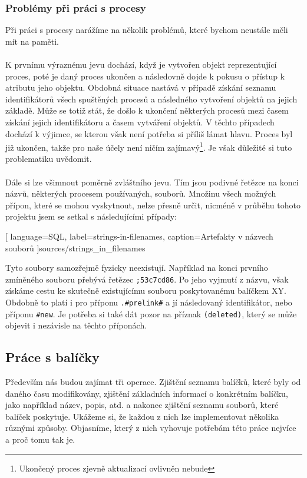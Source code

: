 \documentclass[
  field=inf,
  biblatex,
  glossaries,
  index
]{kidiplom}
\begin{document}
	\subsubsection{Problémy při práci s procesy}
		Při práci s procesy narážíme na několik problémů, které bychom neustále měli mít na paměti.
		\\
		\\
		K prvnímu výraznému jevu dochází, když je vytvořen objekt reprezentující proces, poté je daný proces ukončen a následovně dojde k pokusu o přístup k atributu jeho objektu. Obdobná situace nastává v případě získání seznamu identifikátorů všech spuštěných procesů a následného vytvoření objektů na jejich základě. Může se totiž stát, že došlo k ukončení některých procesů mezi časem získání jejich identifikátoru a časem vytváření objektů. V těchto případech dochází k výjimce, se kterou však není potřeba si příliš lámat hlavu. Proces byl již ukončen, takže pro naše účely není ničím zajímavý\footnote{Ukončený proces zjevně aktualizací ovlivněn nebude}. Je však důležité si tuto problematiku uvědomit.
		\\
		\\
		Dále si lze všimnout poměrně zvláštního jevu. Tím jsou podivné řetězce na konci názvů, některých procesem používaných, souborů. Množinu všech možných přípon, které se mohou vyskytnout, nelze přesně určit, nicméně v průběhu tohoto projektu jsem se setkal s následujícími případy:

		
		[
			language=SQL,
			label=strings-in-filenames,
			caption={Artefakty v názvech souborů}
		]{sources/strings_in_filenames}

		Tyto soubory samozřejmě fyzicky neexistují. Například na konci prvního zmíněného souboru přebývá řetězec \texttt{;53c7cd86}. Po jeho vyjmutí z názvu, však získáme cestu ke skutečně existujícímu souboru poskytovanému balíčkem XY\@. Obdobně to platí i pro příponu \texttt{.\#prelink\#} a jí následovaný identifikátor, nebo příponu \texttt{\#new}. Je potřeba si také dát pozor na příznak \texttt{(deleted)}, který se může objevit i nezávisle na těchto příponách.

	\subsection{Práce s balíčky}
		Především nás budou zajímat tři operace. Zjištění seznamu balíčků, které byly od daného času modifikovány, zjištění základních informací o konkrétním balíčku, jako například název, popis, atd. a nakonec zjištění seznamu souborů, které balíček poskytuje. Ukážeme si, že každou z nich lze implementovat několika různými způsoby. Objasníme, který z nich vyhovuje potřebám této práce nejvíce a proč tomu tak je.
\end{document}
